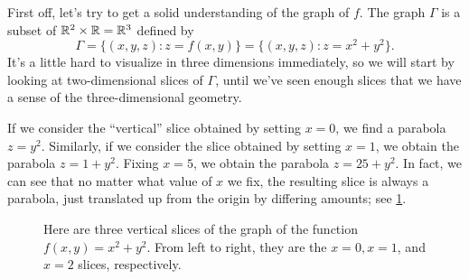 First off, let's try to get a solid understanding of the graph of $f$. The graph $\Gamma$ is a subset of $\mathbb{R}^2 \times \mathbb{R} = \mathbb{R}^3$ defined by
\[ \Gamma = \{ (x, y, z) : z = f(x, y) \} = \{ (x, y, z) : z = x^2  + y^2 \}. \]
It's a little hard to visualize in three dimensions immediately, so we will start by looking at two-dimensional slices of $\Gamma$, until we've seen enough slices that we have a sense of the three-dimensional geometry. 

If we consider the ``vertical'' slice obtained by setting $x = 0$, we find a parabola $z = y^2$. Similarly, if we consider the slice obtained by setting $x = 1$, we obtain the parabola $z = 1 + y^2$. Fixing $x = 5$, we obtain the parabola $z = 25 + y^2$. In fact, we can see that no matter what value of $x$ we fix, the resulting slice is always a parabola, just translated up from the origin by differing amounts; see \cref{multi-introductory-example-slices}. 

\begin{figure}[ht]
	\begin{center}
	\end{center}
	\caption{Here are three vertical slices of the graph of the function $f(x,y) = x^2 + y^2$. From left to right, they are the $x = 0, x = 1$, and $x = 2$ slices, respectively.} \label{multi-introductory-example-slices}
\end{figure}

